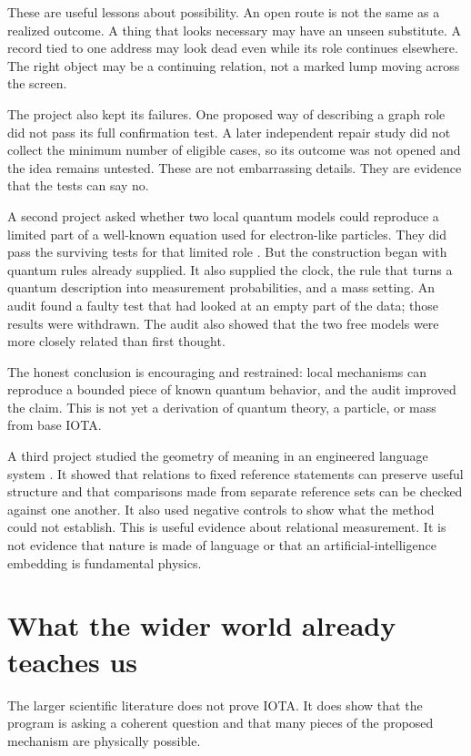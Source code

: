\documentclass[11pt]{article}
\begin{document}
These are useful lessons about possibility. An open route is not the same as a
realized outcome. A thing that looks necessary may have an unseen substitute.
A record tied to one address may look dead even while its role continues
elsewhere. The right object may be a continuing relation, not a marked lump
moving across the screen.

The project also kept its failures. One proposed way of describing a graph
role did not pass its full confirmation test. A later independent repair study
did not collect the minimum number of eligible cases, so its outcome was not
opened and the idea remains untested. These are not embarrassing details. They
are evidence that the tests can say no.

A second project asked whether two local quantum models could reproduce a
limited part of a well-known equation used for electron-like particles. They
did pass the surviving tests for that limited role \citep{Clark2026DiracRole}.
But the construction began with quantum rules already supplied. It also
supplied the clock, the rule that turns a quantum description into measurement
probabilities, and a mass setting. An audit found a faulty test that had looked
at an empty part of the data; those results were withdrawn. The audit also
showed that the two free models were more closely related than first thought.

The honest conclusion is encouraging and restrained: local mechanisms can
reproduce a bounded piece of known quantum behavior, and the audit improved
the claim. This is not yet a derivation of quantum theory, a particle, or mass
from base IOTA.

A third project studied the geometry of meaning in an engineered language
system \citep{Clark2026PSA}. It showed that relations to fixed reference
statements can preserve useful structure and that comparisons made from
separate reference sets can be checked against one another. It also used
negative controls to show what the method could not establish. This is useful
evidence about relational measurement. It is not evidence that nature is made
of language or that an artificial-intelligence embedding is fundamental
physics.

\section*{What the wider world already teaches us}

The larger scientific literature does not prove IOTA. It does show that the
program is asking a coherent question and that many pieces of the proposed
mechanism are physically possible.
\end{document}
